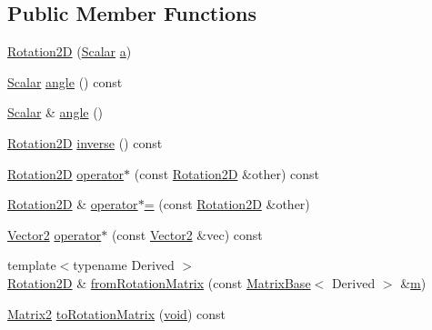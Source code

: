 \subsection*{Public Member Functions}
\begin{DoxyCompactItemize}
\item 
\hyperlink{class_rotation2_d_af7a1ccdfeaebe08f830ffeab415d9d0b}{Rotation2\-D} (\hyperlink{class_rotation2_d_a9fe0daf4c508069bf7c4b5705f89dc0c}{Scalar} \hyperlink{glext_8h_ac8729153468b5dcf13f971b21d84d4e5}{a})
\item 
\hyperlink{class_rotation2_d_a9fe0daf4c508069bf7c4b5705f89dc0c}{Scalar} \hyperlink{class_rotation2_d_a3796ad5cb3b8c53e8b15c2a34692336f}{angle} () const 
\item 
\hyperlink{class_rotation2_d_a9fe0daf4c508069bf7c4b5705f89dc0c}{Scalar} \& \hyperlink{class_rotation2_d_a16c93a25cf0c7b7fe4b6345554d5b904}{angle} ()
\item 
\hyperlink{class_rotation2_d}{Rotation2\-D} \hyperlink{class_rotation2_d_a36d72014dec6431e1f07a67243d77a34}{inverse} () const 
\item 
\hyperlink{class_rotation2_d}{Rotation2\-D} \hyperlink{class_rotation2_d_a9b896581ead0e4185e6f524f58ca2d4c}{operator$\ast$} (const \hyperlink{class_rotation2_d}{Rotation2\-D} \&other) const 
\item 
\hyperlink{class_rotation2_d}{Rotation2\-D} \& \hyperlink{class_rotation2_d_aad832bdf3614e4d45424730516495f95}{operator$\ast$=} (const \hyperlink{class_rotation2_d}{Rotation2\-D} \&other)
\item 
\hyperlink{class_rotation2_d_abdc2e1016e3191a88dc42877fd5a50f0}{Vector2} \hyperlink{class_rotation2_d_a0ff74e19778afb0b04b569a961d2f5af}{operator$\ast$} (const \hyperlink{class_rotation2_d_abdc2e1016e3191a88dc42877fd5a50f0}{Vector2} \&vec) const 
\item 
{\footnotesize template$<$typename Derived $>$ }\\\hyperlink{class_rotation2_d}{Rotation2\-D} \& \hyperlink{class_rotation2_d_a72d37ef90248b3c14995fc682f106d38}{from\-Rotation\-Matrix} (const \hyperlink{class_matrix_base}{Matrix\-Base}$<$ Derived $>$ \&\hyperlink{glext_8h_af593500c283bf1a787a6f947f503a5c2}{m})
\item 
\hyperlink{class_rotation2_d_a1a1acef614c61a56878f65e6b58f4a77}{Matrix2} \hyperlink{class_rotation2_d_af4b9f507cddb946e92ec94f6f5c1efbe}{to\-Rotation\-Matrix} (\hyperlink{group___u_a_v_objects_plugin_ga444cf2ff3f0ecbe028adce838d373f5c}{void}) const 
\item 

\end{DoxyCompactItemize}
